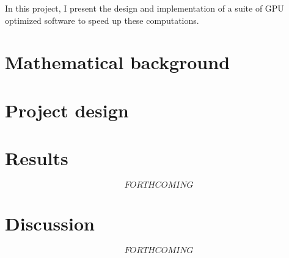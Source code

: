 \documentclass{article}
\theoremstyle{exampstyle} \newtheorem*{remark}{Remark}
\newcommand{\1}{\mathds{1}}
\begin{document}
In this project, I present the design and implementation of a suite of GPU optimized software to speed up these computations. %


\section{Mathematical background}


\section{Project design}


\section{Results}

$$ FORTHCOMING $$

\section{Discussion}

$$ FORTHCOMING $$
\end{document}
